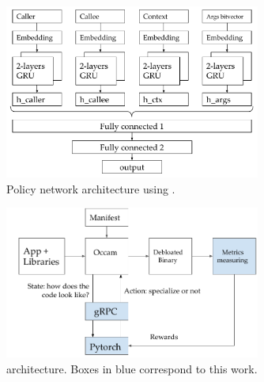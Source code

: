      \begin{figure}
         \centering
         \includegraphics[width=0.75\textwidth]{doccam_figures/inst2vec_occam.pdf}
         \caption{Policy network architecture using \insttovec .}
         \label{fig:inst2vec_occam}
     \end{figure}
     \begin{figure}
         \centering
         \includegraphics[width=0.75\textwidth]{doccam_figures/D-OCCAM.pdf}
         \caption{\doccam architecture. Boxes in blue correspond to this work.}
         \label{fig:d-occam}
     \end{figure}


